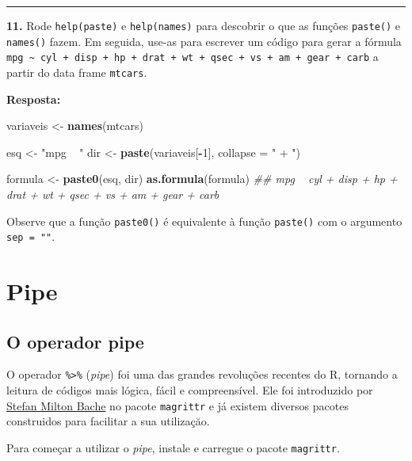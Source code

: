 \documentclass[]{book}
\newenvironment{Shaded}{\begin{snugshade}}{\end{snugshade}}
\newcommand{\CommentTok}[1]{\textcolor[rgb]{0.56,0.35,0.01}{\textit{#1}}}
\newcommand{\DataTypeTok}[1]{\textcolor[rgb]{0.13,0.29,0.53}{#1}}
\newcommand{\DecValTok}[1]{\textcolor[rgb]{0.00,0.00,0.81}{#1}}
\newcommand{\KeywordTok}[1]{\textcolor[rgb]{0.13,0.29,0.53}{\textbf{#1}}}
\newcommand{\NormalTok}[1]{#1}
\newcommand{\OperatorTok}[1]{\textcolor[rgb]{0.81,0.36,0.00}{\textbf{#1}}}
\newcommand{\StringTok}[1]{\textcolor[rgb]{0.31,0.60,0.02}{#1}}
\begin{document}
\begin{center}\rule{0.5\linewidth}{\linethickness}\end{center}

\textbf{11.} Rode \texttt{help(paste)} e \texttt{help(names)} para descobrir o que as funções \texttt{paste()} e \texttt{names()} fazem. Em seguida, use-as para escrever um código para gerar a fórmula \texttt{mpg\ \textasciitilde{}\ cyl\ +\ disp\ +\ hp\ +\ drat\ +\ wt\ +\ qsec\ +\ vs\ +\ am\ +\ gear\ +\ carb} a partir do data frame \texttt{mtcars}.

\textbf{Resposta:}

\begin{Shaded}
\begin{Highlighting}[]
\NormalTok{variaveis <-}\StringTok{ }\KeywordTok{names}\NormalTok{(mtcars)}

\NormalTok{esq <-}\StringTok{ "mpg ~ "}
\NormalTok{dir <-}\StringTok{ }\KeywordTok{paste}\NormalTok{(variaveis[}\OperatorTok{-}\DecValTok{1}\NormalTok{], }\DataTypeTok{collapse =} \StringTok{" + "}\NormalTok{)}

\NormalTok{formula <-}\StringTok{ }\KeywordTok{paste0}\NormalTok{(esq, dir)}
\KeywordTok{as.formula}\NormalTok{(formula)}
\CommentTok{## mpg ~ cyl + disp + hp + drat + wt + qsec + vs + am + gear + carb}
\end{Highlighting}
\end{Shaded}

Observe que a função \texttt{paste0()} é equivalente à função \texttt{paste()} com o argumento \texttt{sep\ =\ ""}.

\hypertarget{pipe}{%
\chapter{Pipe}\label{pipe}}

\hypertarget{o-operador-pipe}{%
\section{O operador pipe}\label{o-operador-pipe}}

O operador \texttt{\%\textgreater{}\%} (\emph{pipe}) foi uma das grandes revoluções recentes do R, tornando a leitura de códigos mais lógica, fácil e compreensível. Ele foi introduzido por \href{https://github.com/smbache}{Stefan Milton Bache} no pacote \texttt{magrittr} e já existem diversos pacotes construidos para facilitar a sua utilizaçăo.

Para começar a utilizar o \emph{pipe}, instale e carregue o pacote \texttt{magrittr}.
\end{document}
